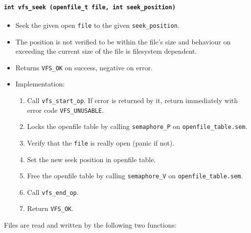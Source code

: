 \documentclass[twoside,a4paper]{report}
\makeatletter
\newenvironment{function}[3]{%
\paragraph{\texttt{#1 {\textbf{#2}} (#3)}}%
\index{#2@\texttt{#2}}%
\begin{itemize}%
}{%
\end{itemize}%
}
\makeatother
\begin{document}
\begin{function}{int}{vfs\_seek}{openfile\_t file, int seek\_position}

\item Seek the given open \texttt{file} to the given \texttt{seek\_position}.

\item The position is not verified to be within the file's size and
behaviour on exceeding the current size of the file is filesystem
dependent.

\item Returns \texttt{VFS\_OK} on success, negative on error.

\item Implementation:
\begin{enumerate}

\item Call \texttt{vfs\_start\_op}. If error is returned by it,
 return immediately with error code \texttt{VFS\_UNUSABLE}.

\item Locks the openfile table by calling \texttt{semaphore\_P} on
\texttt{openfile\_table.sem}.

\item Verify that the \texttt{file} is really open (panic if not).

\item Set the new seek position in openfile table.

\item Free the openfile table by calling \texttt{semaphore\_V} on
\texttt{openfile\_table.sem}.

\item Call \texttt{vfs\_end\_op}.

\item Return \texttt{VFS\_OK}.

\end{enumerate}
\end{function}

Files are read and written by the following two functions:
\end{document}
